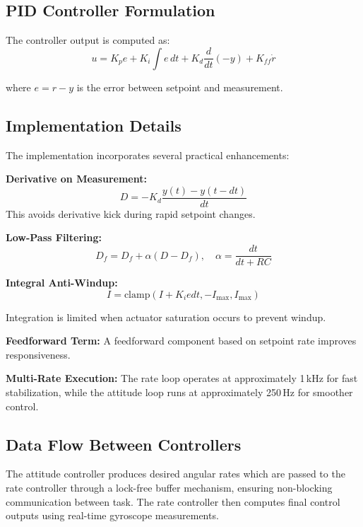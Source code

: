 \subsection{PID Controller Formulation}

The controller output is computed as:
\[
u = K_p e + K_i \int e\,dt + K_d \frac{d}{dt}(-y) + K_{ff} \dot{r}
\]

where $e = r - y$ is the error between setpoint and measurement.

\subsection{Implementation Details}

The implementation incorporates several practical enhancements:

\textbf{Derivative on Measurement:}
\[
D = -K_d \frac{y(t) - y(t - dt)}{dt}
\]
This avoids derivative kick during rapid setpoint changes.

\textbf{Low-Pass Filtering:}
\[
D_f = D_f + \alpha (D - D_f), \quad \alpha = \frac{dt}{dt + RC}
\]

\textbf{Integral Anti-Windup:}
\[
I = \text{clamp}(I + K_i e dt, -I_{\max}, I_{\max})
\]

Integration is limited when actuator saturation occurs to prevent windup.

\textbf{Feedforward Term:}  
A feedforward component based on setpoint rate improves responsiveness.

\textbf{Multi-Rate Execution:}  
The rate loop operates at approximately 1\,kHz for fast stabilization, while the attitude loop runs at approximately 250\,Hz for smoother control.

\subsection{Data Flow Between Controllers}

The attitude controller produces desired angular rates which are passed to the rate controller through a lock-free buffer mechanism, ensuring non-blocking communication between task. The rate controller then computes final control outputs using real-time gyroscope measurements.
